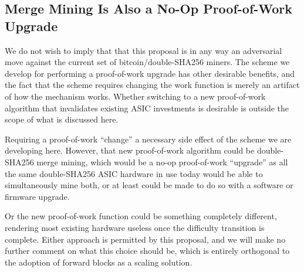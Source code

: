 \subsection{Merge Mining Is Also a No-Op Proof-of-Work Upgrade}

We do not wish to imply that that this proposal is in any way an
adversarial move against the current set of bitcoin/double-SHA256
miners.  The scheme we develop for performing a proof-of-work upgrade
has other desirable benefits, and the fact that the scheme requires
changing the work function is merely an artifact of how the mechanism
works.  Whether switching to a new proof-of-work algorithm that
invalidates existing ASIC investments is desirable is outside the
scope of what is discussed here.

Requiring a proof-of-work ``change'' a necessary side effect of the
scheme we are developing here.  However, that new proof-of-work
algorithm could be double-SHA256 merge mining, which would be a no-op
proof-of-work ``upgrade'' as all the same double-SHA256 ASIC hardware
in use today would be able to simultaneously mine both, or at least
could be made to do so with a software or firmware upgrade.

Or the new proof-of-work function could be something completely
different, rendering most existing hardware useless once the
difficulty transition is complete.  Either approach is permitted by
this proposal, and we will make no further comment on what this choice
should be, which is entirely orthogonal to the adoption of
forward blocks as a scaling solution.
